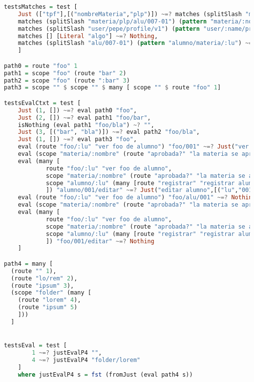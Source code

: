 \documentclass[10pt,a4paper]{article}
\begin{document}
\begin{lstlisting}[language=Haskell,breaklines=true,basicstyle=\tiny]
testsMatches = test [
    Just (["tpf"],[("nombreMateria","plp")]) ~=? matches (splitSlash "materias/plp/tpf") (pattern "materias/:nombreMateria"),
    matches (splitSlash "materia/plp/alu/007-01") (pattern "materia/:nombre") ~=? Just (["alu","007-01"],[("nombre","plp")]),
    matches (splitSlash "user/pepe/profile/v1") (pattern "user/:name/profile/:api") ~=? Just ([],[("name","pepe"),("api","v1")]),
    matches [] [Literal "algo"] ~=? Nothing,
    matches (splitSlash "alu/007-01") (pattern "alumno/materia/:lu") ~=? Nothing
    ]

path0 = route "foo" 1
path1 = scope "foo" (route "bar" 2)
path2 = scope "foo" (route ":bar" 3)
path3 = scope "" $ scope "" $ many [ scope "" $ route "foo" 1]

testsEvalCtxt = test [
    Just (1, []) ~=? eval path0 "foo",
    Just (2, []) ~=? eval path1 "foo/bar",
    isNothing (eval path1 "foo/bla") ~? "",
    Just (3, [("bar", "bla")]) ~=? eval path2 "foo/bla",
    Just (1, []) ~=? eval path3 "foo",
    eval (route "foo/:lu" "ver foo de alumno") "foo/001" ~=? Just("ver foo de alumno", [("lu","001")]),
    eval (scope "materia/:nombre" (route "aprobada?" "la materia se aprobo?")) "materia/plp/aprobada?" ~=? Just("la materia se aprobo?", [("nombre","plp")]),
    eval (many [
            route "foo/:lu" "ver foo de alumno",
            scope "materia/:nombre" (route "aprobada?" "la materia se aprobo?"),
            scope "alumno/:lu" (many [route "registrar" "registrar alumno", route "editar" "editar alumno", route "eliminar" "eliminar alumno"])
            ]) "alumno/001/editar" ~=? Just("editar alumno",[("lu","001")]),
    eval (route "foo/:lu" "ver foo de alumno") "foo/alu/001" ~=? Nothing,
    eval (scope "materia/:nombre" (route "aprobada?" "la materia se aprobo?")) "materia/nombre/plp/aprobada?" ~=? Nothing,
    eval (many [
            route "foo/:lu" "ver foo de alumno",
            scope "materia/:nombre" (route "aprobada?" "la materia se aprobo?"),
            scope "alumno/:lu" (many [route "registrar" "registrar alumno", route "editar" "editar alumno", route "eliminar" "eliminar alumno"])
            ]) "foo/001/editar" ~=? Nothing
    ]

path4 = many [
  (route "" 1),
  (route "lo/rem" 2),
  (route "ipsum" 3),
  (scope "folder" (many [
    (route "lorem" 4),
    (route "ipsum" 5)
    ]))
  ]


testsEval = test [
        1 ~=? justEvalP4 "",
        4 ~=? justEvalP4 "folder/lorem"
    ]
    where justEvalP4 s = fst (fromJust (eval path4 s))


\end{lstlisting}
\end{document}

